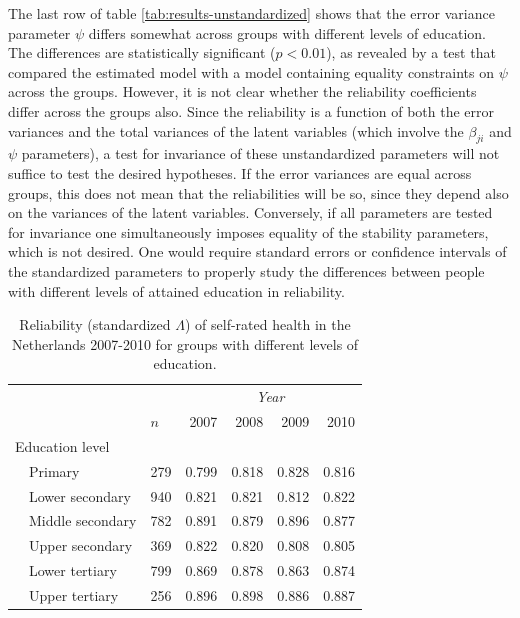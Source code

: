 \documentclass[a4paper,11pt]{article}
\newcommand{\0}{\boldsymbol{0}}
\begin{document}
The last row of table \ref{tab:results-unstandardized} shows that the error variance parameter $\psi$ 
differs somewhat across groups with different levels of education. The differences are statistically
significant ($p < 0.01$), as revealed by a test that compared the estimated model with a model 
containing equality constraints on $\psi$ across the groups. However, it is not clear whether 
the reliability coefficients differ across the groups also.
Since the reliability is a function of both the error variances and the total variances of the latent variables (which involve the 
$\beta_{ji}$ and $\psi$ parameters), a test for invariance of these unstandardized parameters will not suffice to test the desired hypotheses. 
If the error variances are equal across groups, this does not mean that the reliabilities will be so, since they depend also on the
variances of the latent variables. Conversely, if all parameters are tested for invariance one simultaneously imposes equality of the
stability parameters, which is not desired.
One would require standard errors or confidence intervals of the standardized parameters to properly study the differences between people with different levels of attained education in reliability.



\begin{table}[bth]
\begin{center}\begin{small}
\begin{tabular}{lllrrrr}  \hline  \hline
&&&  \multicolumn{4}{c}{\emph{Year}}\\\cline{4-7}
&&$n$& 2007&2008&2009&2010\\
  \hline
  \multicolumn{2}{l}{Education level}\\
& Primary	   & 279  & 0.799 & 0.818 & 0.828 & 0.816 \\ 
& Lower secondary  & 940  & 0.821 & 0.821 & 0.812 & 0.822 \\ 
& Middle secondary & 782  & 0.891 & 0.879 & 0.896 & 0.877 \\ 
& Upper secondary  & 369  & 0.822 & 0.820 & 0.808 & 0.805 \\ 
& Lower tertiary   & 799  & 0.869 & 0.878 & 0.863 & 0.874 \\ 
& Upper tertiary   & 256  & 0.896 & 0.898 & 0.886 & 0.887 \\ 
  \hline     \hline
\end{tabular}
\caption{Reliability (standardized $\Lambda$) of self-rated health in the Netherlands 2007-2010 for groups with different levels of education.}\label{tab:first-results}\end{small}
\end{center}
\end{table}
\end{document}
